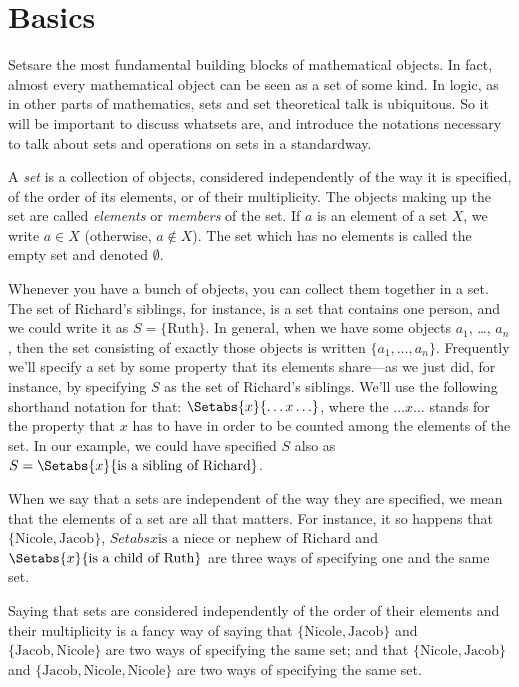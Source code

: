 \documentclass[open-logic-section]{subfiles}
\begin{document}
\section{Basics}

\begin{wordy}
Setsare the most fundamental building blocks of mathematical
objects. In fact, almost every mathematical object can be seen as a
set of some kind.  In logic, as in other parts of mathematics, sets
and set theoretical talk is ubiquitous.  So it will be important to
discuss whatsets are, and introduce the notations necessary to talk
about sets and operations on sets in a standardway.
\end{wordy}

\begin{defn}
A \emph{set} is a collection of objects, considered independently of
the way it is specified, of the order of its elements, or of their
multiplicity. The objects making up the set are called \emph{elements}
or \emph{members} of the set. If $a$ is an element of a set $X$, we
write $a \in X$ (otherwise, $a \notin X$). The set which has no elements
is called the empty set and denoted $\emptyset$.
\end{defn}

\begin{ex}
Whenever you have a bunch of objects, you can collect them together in
a set. The set of Richard's siblings, for instance, is a set that
contains one person, and we could write it as $S=\{\textrm{Ruth}\}$.
In general, when we have some objects $a_{1}$, \dots, $a_{n}$, then
the set consisting of exactly those objects is written $\{
a_{1},\ldots,a_{n}\}$.  Frequently we'll specify a set by some
property that its elements share---as we just did, for instance, by
specifying $S$ as the set of Richard's siblings. We'll use the
following shorthand notation for that: $\Setabs{x}{\ldots x\ldots}$,
where the $\ldots x\ldots$ stands for the property that $x$ has to
have in order to be counted among the elements of the set. In our
example, we could have specified $S$ also as $S = \Setabs{x}{\text{is
a sibling of Richard}}$. 
\end{ex}

\begin{wordy}
When we say that a sets are independent of the way they are specified,
we mean that the elements of a set are all that matters. For instance,
it so happens that $\{\text{Nicole}, \text{Jacob}\}$,
$Setabs{x}{\text{is a niece or nephew of Richard}}$ and
$\Setabs{x}{\text{is a child of Ruth}}$ are three ways of specifying
one and the same set.

Saying that sets are considered independently of the order of their
elements and their multiplicity is a fancy way of saying that
$\{\text{Nicole}, \text{Jacob}\}$ and $\{\text{Jacob},
\text{Nicole}\}$ are two ways of specifying the same set; and that
$\{\text{Nicole}, \text{Jacob}\}$ and $\{\text{Jacob}, \text{Nicole},
\text{Nicole}\}$ are two ways of specifying the same set.
\end{wordy}
\end{document}
